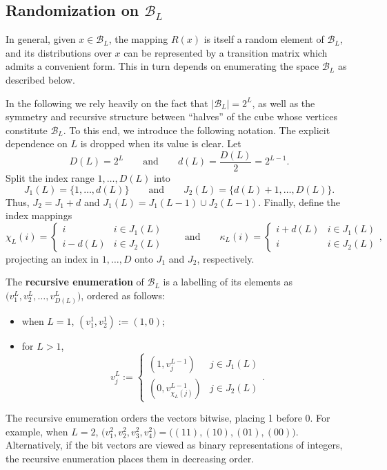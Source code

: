 \documentclass[11pt,draft]{article}
\newcommand{\Bsp}{\mathcal{B}}
\begin{document}
\subsection{Randomization on $\Bsp_L$}
\label{sec:transprobs}

In general, given $x\in\Bsp_L$, the mapping $R(x)$ is itself a random element of
$\Bsp_L$, and its distributions over $x$ can be represented by a transition
matrix which admits a convenient form.
This in turn depends on enumerating the space $\Bsp_L$ as described below.

In the following we rely heavily on the fact that $|\Bsp_L| = 2^L$, as well
as the symmetry and recursive structure between ``halves'' of the cube
whose vertices constitute $\Bsp_L$.
To this end, we introduce the following notation. The explicit dependence
on $L$ is dropped when its value is clear.
Let
\[ D(L) = 2^L \qquad\text{and}\qquad d(L) = \frac{D(L)}{2} = 2^{L-1}. \]
Split the index range $1,\dots, D(L)$ into
\[ J_1(L) = \big\{1,\dots,d(L)\big\} \qquad\text{and}\qquad
J_2(L) = \big\{d(L) + 1,\dots, D(L) \big\}. \]
Thus, $J_2 = J_1 + d$ and $J_1(L) = J_1(L-1) \cup J_2(L-1)$.
Finally, define the index mappings
\[ \chi_L(i) = \begin{cases} i & i \in J_1(L) \\ i - d(L) & i \in J_2(L)
\end{cases} \qquad\text{and}\qquad
\kappa_L(i) = \begin{cases} i + d(L) & i \in J_1(L) \\ i & i \in J_2(L)
\end{cases}, \]
projecting an index in $1,\dots,D$ onto $J_1$ and $J_2$, respectively.

\begin{defn}
The \textbf{recursive enumeration} of $\Bsp_L$ is a labelling of its elements
as $\big(v_1^L,v_2^L,\dots,v_{D(L)}^L\big)$, ordered as follows:
\begin{itemize}
\item when $L=1$, $(v_1^1, v_2^1) := (1, 0)$;
\item for $L > 1$,
\[ v_j^L := \begin{cases}(1, v_j^{L-1}) & j \in J_1(L) \\
    (0, v_{\chi_L(j)}^{L-1}) & j \in J_2(L) \end{cases}. \]
\end{itemize}
\end{defn}

The recursive enumeration orders the vectors bitwise, placing 1 before 0.
For example, when $L=2$,
$\big(v_1^2, v_2^2, v_3^2, v_4^2\big) = \big((11), (10), (01), (00)\big)$.
Alternatively, if the bit vectors are viewed as binary representations of
integers, the recursive enumeration places them in decreasing order.
\end{document}
